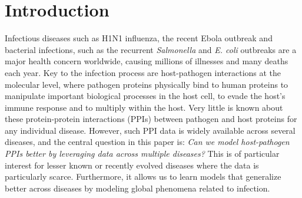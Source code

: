 \documentclass[runningheads,a4paper]{llncs}
\begin{document}
\section{Introduction}


Infectious diseases such as H1N1 influenza, the recent Ebola outbreak and bacterial infections, such as the recurrent \textit{Salmonella} and \textit{E. coli} outbreaks
are a major health concern worldwide, causing millions of illnesses and many deaths each year. 
Key to the infection process are host-pathogen interactions at the molecular level, where pathogen proteins physically bind to human proteins
to manipulate important biological processes in the host cell, to evade the host's immune response and to multiply within the host.
Very little is known about these protein-protein interactions (PPIs) between pathogen and host proteins for any individual disease.
However, such PPI data is widely available across several diseases, and the central question in this
paper is: \emph{Can we model host-pathogen PPIs better by leveraging
data across multiple diseases?} This is of particular interest for 
lesser known or recently evolved diseases where the data is particularly scarce. Furthermore, it
allows us to learn models that generalize better across diseases by
modeling global phenomena related to infection.
\end{document}
